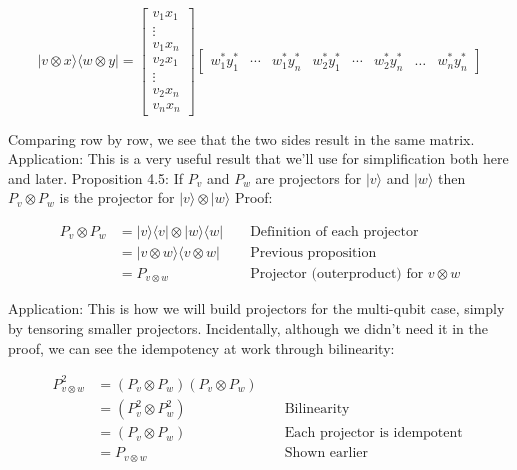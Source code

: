 \documentclass[main.tex]{subfiles}
\begin{document}
    $$
    |v \otimes x\rangle\langle w \otimes y|=\left[\begin{array}{c}
    v_{1} x_{1} \\
    \vdots \\
    v_{1} x_{n} \\
    v_{2} x_{1} \\
    \vdots \\
    v_{2} x_{n} \\
    v_{n} x_{n}
    \end{array}\right]
    \left[\begin{array}{llllllll}
    w_{1}^{*} y_{1}^{*} & \cdots & w_{1}^{*} y_{n}^{*} & w_{2}^{*} y_{1}^{*} & \cdots & w_{2}^{*} y_{n}^{*} & \ldots & w_{n}^{*} y_{n}^{*}
    \end{array}\right]
    $$
    
    Comparing row by row, we see that the two sides result in the same matrix. Application: This is a very useful result that we'll use for simplification both here and later. Proposition 4.5: If $P_{v}$ and $P_{w}$ are projectors for $|v\rangle$ and $|w\rangle$ then $P_{v} \otimes P_{w}$ is the projector for $|v\rangle \otimes|w\rangle$ Proof:
    
    $$
    \begin{aligned}
    P_{v} \otimes P_{w} &=|v\rangle\langle v|\otimes| w\rangle\langle w| & & \text { Definition of each projector } \\
    &=|v \otimes w\rangle\langle v \otimes w| & & \text { Previous proposition } \\
    &=P_{v \otimes w} & & \text { Projector (outerproduct) for } v \otimes w
    \end{aligned}
    $$
    
    Application: This is how we will build projectors for the multi-qubit case, simply by tensoring smaller projectors. Incidentally, although we didn't need it in the proof, we can see the idempotency at work through bilinearity:
    
    $$
    \begin{aligned}
    P_{v \otimes w}^{2} &=\left(P_{v} \otimes P_{w}\right)\left(P_{v} \otimes P_{w}\right) & & \\
    &=\left(P_{v}^{2} \otimes P_{w}^{2}\right) & & \text { Bilinearity } \\
    &=\left(P_{v} \otimes P_{w}\right) & & \text { Each projector is idempotent } \\
    &=P_{v \otimes w} & & \text { Shown earlier }
    \end{aligned}
    $$
    
\end{document}
